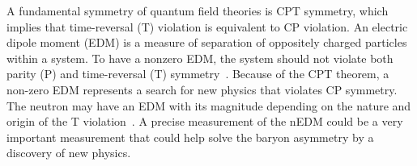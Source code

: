A fundamental symmetry of quantum field theories is CPT symmetry, which implies that time-reversal (T) violation is equivalent to CP violation.  An electric dipole moment (EDM) is a measure of separation of oppositely charged particles within a system. To have a nonzero EDM, the system should not violate both parity (P) and time-reversal (T) symmetry~\cite{edm_reason}. Because of the CPT theorem, a non-zero EDM represents a search for new physics that violates CP symmetry. The neutron may have an EDM with its magnitude depending on the nature and origin of the T violation~\cite{nEDM_reason}. A precise measurement of the nEDM could be a very important measurement that could help solve the baryon asymmetry by a discovery of new physics.




